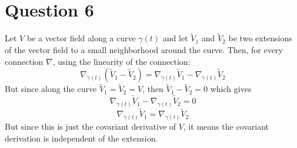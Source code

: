 \documentclass{article}
\begin{document}
\section*{Question 6}
Let $V$ be a vector field along a curve $\gamma(t)$ and let $\tilde{V}_1$ and $\tilde{V}_2$ be two extensions of the vector field to a small neighborhood around the curve. Then, for every connection $\nabla$, using the linearity of the connection:
\begin{equation}
    \nabla_{\dot{\gamma}(t)} \left(\tilde{V}_1 - \tilde{V}_2\right) = 
    \nabla_{\dot{\gamma}(t)} \tilde{V}_1 - \nabla_{\dot{\gamma}(t)} \tilde{V}_2
\end{equation}
But since along the curve $\tilde{V}_1 = \tilde{V}_2 = V$, then $\tilde{V}_1 - \tilde{V}_2 = 0$ which gives
\begin{equation}
    \nabla_{\dot{\gamma}(t)} \tilde{V}_1 - \nabla_{\dot{\gamma}(t)} \tilde{V}_2 = 0
\end{equation}
\begin{equation}
    \nabla_{\dot{\gamma}(t)} \tilde{V}_1 = \nabla_{\dot{\gamma}(t)} \tilde{V}_2
\end{equation}
But since this is just the covariant derivative of $V$, it means the covariant derivation is independent of the extension.
\end{document}
